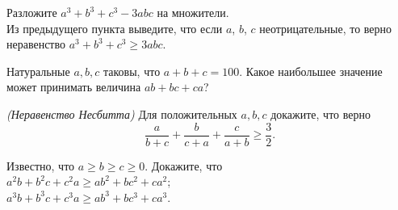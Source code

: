 



\begin{problems}

\item 
\subproblem
Разложите $a^3 + b^3 + c^3 - 3 a b c$ на множители.
\\
\subproblem
Из предыдущего пункта выведите, что если $a$, $b$, $c$ неотрицательные, то верно неравенство
$a^3 + b^3 + c^3 \geq 3abc$.

\item
Натуральные $a, b, c$ таковы, что $a + b + c = 100$.
Какое наибольшее значение может принимать величина $a b + b c + c a$?

\item
\emph{(Неравенство Несбитта)}
Для положительных $a, b, c$ докажите, что верно
\[
\frac{a}{b + c} + \frac{b}{c + a} + \frac{c}{a + b} \geq \frac{3}{2}.
\]

\item
Известно, что $a \geq b \geq c \geq 0$.
Докажите, что 
\\
\subproblem $a^2 b + b^2 c + c^2 a \geq a b^2 + b c^2 + c a^2$;
\\
\subproblem $a^3 b + b^3 c + c^3 a \geq a b^3 + b c^3 + c a^3$.

\end{problems}

